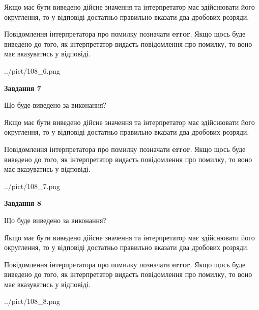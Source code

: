 \documentclass[12pt, ukrainian]{article}
\begin{document}
{\begin {Large}
Якщо має бути виведено дійсне значення та інтерпретатор має здійснювати його округлення, 
то у відповіді достатньо правильно вказати два дробових розряди.

Повідомлення інтерпретатора про помилку позначати \textbf{error}.
Якщо щось буде виведено до того, як інтерпретатор видасть повідомлення про помилку, 
то воно має вказуватись у відповіді. \par

\begin{center}
	{../pict/108_6.png}
\end{center}
\newpage

{\begin {center}\textbf{Завдання 7}\end {center}}\par
Що буде виведено за виконання? \par

Якщо має бути виведено дійсне значення та інтерпретатор має здійснювати його округлення, 
то у відповіді достатньо правильно вказати два дробових розряди.

Повідомлення інтерпретатора про помилку позначати \textbf{error}.
Якщо щось буде виведено до того, як інтерпретатор видасть повідомлення про помилку, 
то воно має вказуватись у відповіді. \par

\begin{center}
	{../pict/108_7.png}
\end{center}
\newpage

{\begin {center}\textbf{Завдання 8}\end {center}}\par
Що буде виведено за виконання? \par

Якщо має бути виведено дійсне значення та інтерпретатор має здійснювати його округлення, 
то у відповіді достатньо правильно вказати два дробових розряди.

Повідомлення інтерпретатора про помилку позначати \textbf{error}.
Якщо щось буде виведено до того, як інтерпретатор видасть повідомлення про помилку, 
то воно має вказуватись у відповіді. \par

\begin{center}
	{../pict/108_8.png}
\end{center}
\newpage


\end{Large}}
\end{document}
